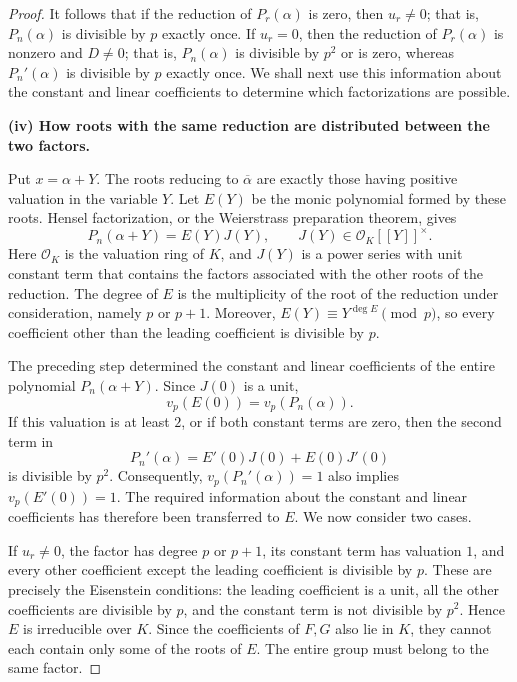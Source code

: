 \documentclass[11pt,a4paper]{article}
\numberwithin{equation}{section}
\theoremstyle{definition}
\begin{document}
\begin{proof}
It follows that if the reduction of \(P_r(\alpha)\) is zero, then \(u_r\ne0\); that is, \(P_n(\alpha)\) is divisible by \(p\) exactly once. If \(u_r=0\), then the reduction of \(P_r(\alpha)\) is nonzero and \(D\ne0\); that is, \(P_n(\alpha)\) is divisible by \(p^2\) or is zero, whereas \(P_n'(\alpha)\) is divisible by \(p\) exactly once. We shall next use this information about the constant and linear coefficients to determine which factorizations are possible.

\textbf{(iv) How roots with the same reduction are distributed between the two factors.}

Put \(x=\alpha+Y\). The roots reducing to \(\overline\alpha\) are exactly those having positive valuation in the variable \(Y\). Let \(E(Y)\) be the monic polynomial formed by these roots. Hensel factorization, or the Weierstrass preparation theorem, gives
\[
P_n(\alpha+Y)=E(Y)J(Y),\qquad J(Y)\in\mathcal O_K[[Y]]^\times.
\]
Here \(\mathcal O_K\) is the valuation ring of \(K\), and \(J(Y)\) is a power series with unit constant term that contains the factors associated with the other roots of the reduction. The degree of \(E\) is the multiplicity of the root of the reduction under consideration, namely \(p\) or \(p+1\). Moreover, \(E(Y)\equiv Y^{\deg E}\pmod p\), so every coefficient other than the leading coefficient is divisible by \(p\).

The preceding step determined the constant and linear coefficients of the entire polynomial \(P_n(\alpha+Y)\). Since \(J(0)\) is a unit,
\[
v_p(E(0))=v_p(P_n(\alpha)).
\]
If this valuation is at least \(2\), or if both constant terms are zero, then the second term in
\[
P_n'(\alpha)=E'(0)J(0)+E(0)J'(0)
\]
is divisible by \(p^2\). Consequently, \(v_p(P_n'(\alpha))=1\) also implies \(v_p(E'(0))=1\). The required information about the constant and linear coefficients has therefore been transferred to \(E\). We now consider two cases.

If \(u_r\ne0\), the factor has degree \(p\) or \(p+1\), its constant term has valuation \(1\), and every other coefficient except the leading coefficient is divisible by \(p\). These are precisely the Eisenstein conditions: the leading coefficient is a unit, all the other coefficients are divisible by \(p\), and the constant term is not divisible by \(p^2\). Hence \(E\) is irreducible over \(K\). Since the coefficients of \(F,G\) also lie in \(K\), they cannot each contain only some of the roots of \(E\). The entire group must belong to the same factor.


\end{proof}
\end{document}
